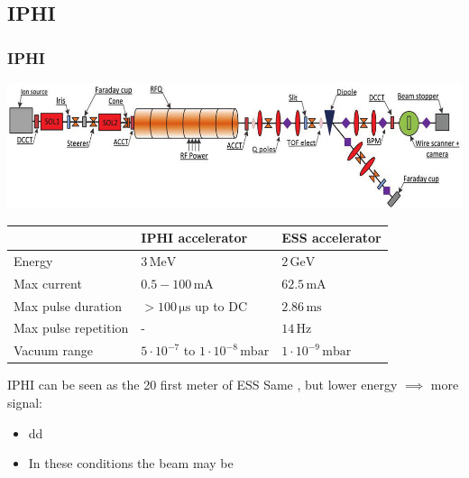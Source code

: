 \subsection{IPHI}
\begin{frame}
  \frametitle{IPHI}
  \includegraphics[width=1\textwidth]{04_Test/fig/fig000_IPHI_view.png}
  \begin{tabularx}{\linewidth}{XXX}
    \toprule
                         & IPHI accelerator                                  & ESS accelerator                \\
    \midrule
    Energy               & $3\,\mathrm{MeV}$                                 & $2\,\mathrm{GeV}$              \\
    Max current          & $0.5-100\,\mathrm{mA}$                            & $62.5\,\mathrm{mA}$            \\
    Max pulse duration   & $>100\,\mathrm{\mu s}$ up to DC                   & $2.86\,\mathrm{ms}$            \\
    Max pulse repetition & -                                                 & $14\,\mathrm{Hz}$              \\
    Vacuum range         & $5\cdot10^{-7}$ to $1\cdot10^{-8}\,\mathrm{mbar}$ & $1\cdot10^{-9}\,\mathrm{mbar}$ \\
    \bottomrule
  \end{tabularx}
  \begin{alertblock}{IPHI can be seen as the 20 first meter of ESS}
    Same , but lower energy $\implies$ more signal:
    \begin{itemize}
      \item dd
      \item In these conditions the beam may be
    \end{itemize}
  \end{alertblock}
\end{frame}


